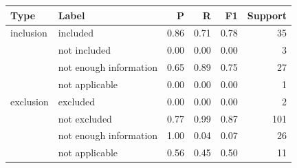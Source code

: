 \begin{tabular}{llrrrr}\toprule
Type & Label & P & R & F1 & Support \\ \midrule
inclusion & included & 0.86 & 0.71 & 0.78 & 35 \\
 & not included & 0.00 & 0.00 & 0.00 & 3 \\
 & not enough information & 0.65 & 0.89 & 0.75 & 27 \\
 & not applicable & 0.00 & 0.00 & 0.00 & 1 \\
\midrule
exclusion & excluded & 0.00 & 0.00 & 0.00 & 2 \\
 & not excluded & 0.77 & 0.99 & 0.87 & 101 \\
 & not enough information & 1.00 & 0.04 & 0.07 & 26 \\
 & not applicable & 0.56 & 0.45 & 0.50 & 11 \\
\bottomrule\end{tabular}